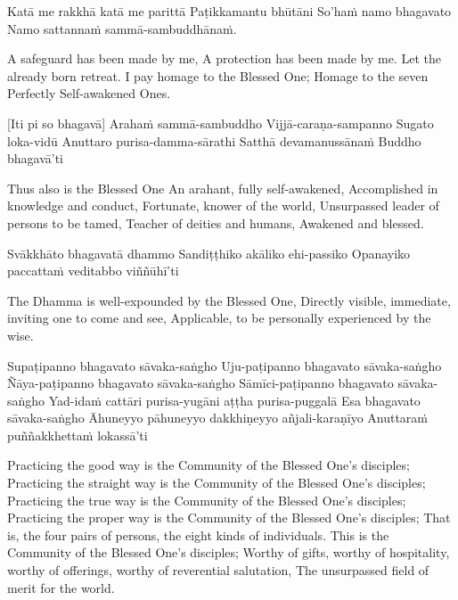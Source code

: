 Katā me rakkhā katā me parittā
Paṭikkamantu bhūtāni
So’haṁ namo bhagavato
Namo sattannaṁ sammā-sambuddhānaṁ.

\begin{english}
  A safeguard has been made by me,
  A protection has been made by me.
  Let the already born retreat.
  I pay homage to the Blessed One;
  Homage to the seven Perfectly Self-awakened Ones.
\end{english}

\suttaRef{[AN 4.67]}

[Iti pi so bhagavā]
Arahaṁ sammā-sambuddho
Vijjā-caraṇa-sampanno
Sugato loka-vidū
Anuttaro purisa-damma-sārathi
Satthā devamanussānaṁ
Buddho bhagavā’ti

\begin{english}
  Thus also is the Blessed One
  An arahant, fully self-awakened,
  Accomplished in knowledge and conduct,
  Fortunate, knower of the world,
  Unsurpassed leader of persons to be tamed,
  Teacher of deities and humans,
  Awakened and blessed.
\end{english}

Svākkhāto bhagavatā dhammo
Sandiṭṭhiko akāliko ehi-passiko
Opanayiko paccattaṁ veditabbo viññūhī’ti

\begin{english}
  The Dhamma is well-expounded by the Blessed One,
  Directly visible, immediate, inviting one to come and see,
  Applicable, to be personally experienced by the wise.
\end{english}

Supaṭipanno bhagavato sāvaka-saṅgho
Uju-paṭipanno bhagavato sāvaka-saṅgho
Ñāya-paṭipanno bhagavato sāvaka-saṅgho
Sāmīci-paṭipanno bhagavato sāvaka-saṅgho
Yad-idaṁ cattāri purisa-yugāni aṭṭha purisa-puggalā
Esa bhagavato sāvaka-saṅgho
Āhuneyyo pāhuneyyo dakkhiṇeyyo añjali-karaṇīyo
Anuttaraṁ puññakkhettaṁ lokassā’ti

\begin{english}
  Practicing the good way is the Community of the Blessed One’s disciples;
  Practicing the straight way is the Community of the Blessed One’s disciples;
  Practicing the true way is the Community of the Blessed One’s disciples;
  Practicing the proper way is the Community of the Blessed One’s disciples;
  That is, the four pairs of persons, the eight kinds of individuals.
  This is the Community of the Blessed One’s disciples;
  Worthy of gifts, worthy of hospitality, worthy of offerings, worthy of reverential salutation,
  The unsurpassed field of merit for the world.
\end{english}

